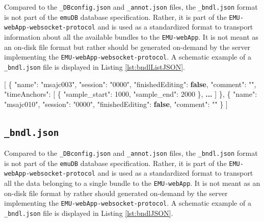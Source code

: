 \documentclass[]{book}
\newenvironment{Shaded}{\begin{snugshade}}{\end{snugshade}}
\newcommand{\DataTypeTok}[1]{\textcolor[rgb]{0.13,0.29,0.53}{#1}}
\newcommand{\DecValTok}[1]{\textcolor[rgb]{0.00,0.00,0.81}{#1}}
\newcommand{\ErrorTok}[1]{\textcolor[rgb]{0.64,0.00,0.00}{\textbf{#1}}}
\newcommand{\FunctionTok}[1]{\textcolor[rgb]{0.00,0.00,0.00}{#1}}
\newcommand{\KeywordTok}[1]{\textcolor[rgb]{0.13,0.29,0.53}{\textbf{#1}}}
\newcommand{\OtherTok}[1]{\textcolor[rgb]{0.56,0.35,0.01}{#1}}
\newcommand{\StringTok}[1]{\textcolor[rgb]{0.31,0.60,0.02}{#1}}
\begin{document}
Compared to the \texttt{\_DBconfig.json} and \texttt{\_annot.json} files, the \texttt{\_bndl.json} format is not part of the \texttt{emuDB} database specification. Rather, it is part of the \texttt{EMU-webApp-websocket-protocol} and is used as a standardized format to transport information about all the available bundles to the \texttt{EMU-webApp}. It is not meant as an on-disk file format but rather should be generated on-demand by the server implementing the \texttt{EMU-webApp-websocket-protocol}. A schematic example of a \texttt{\_bndl.json} file is displayed in Listing \ref{lst:bndlListJSON}.

\begin{Shaded}
\begin{Highlighting}[]
\OtherTok{[}
  \FunctionTok{\{}
  \DataTypeTok{"name"}\FunctionTok{:} \StringTok{"msajc003"}\FunctionTok{,}
  \DataTypeTok{"session"}\FunctionTok{:} \StringTok{"0000"}\FunctionTok{,}
  \DataTypeTok{"finishedEditing"}\FunctionTok{:} \KeywordTok{false}\FunctionTok{,}
  \DataTypeTok{"comment"}\FunctionTok{:} \StringTok{""}\FunctionTok{,}
  \DataTypeTok{"timeAnchors"}\FunctionTok{:} \OtherTok{[}
    \FunctionTok{\{}
      \DataTypeTok{"sample_start"}\FunctionTok{:} \DecValTok{1000}\FunctionTok{,}
      \DataTypeTok{"sample_end"}\FunctionTok{:} \DecValTok{2000}
    \FunctionTok{\}}\OtherTok{,} \ErrorTok{...}
  \OtherTok{]}
  \FunctionTok{\}}\OtherTok{,}
  \FunctionTok{\{}
  \DataTypeTok{"name"}\FunctionTok{:} \StringTok{"msajc010"}\FunctionTok{,}
  \DataTypeTok{"session"}\FunctionTok{:} \StringTok{"0000"}\FunctionTok{,}
  \DataTypeTok{"finishedEditing"}\FunctionTok{:} \KeywordTok{false}\FunctionTok{,}
  \DataTypeTok{"comment"}\FunctionTok{:} \StringTok{""}
  \FunctionTok{\}}
\OtherTok{]}
\end{Highlighting}
\end{Shaded}

\hypertarget{subsec:app-chapExampleFilesBndlJSON}{%
\subsection{\texorpdfstring{\texttt{\_bndl.json}}{\_bndl.json}}\label{subsec:app-chapExampleFilesBndlJSON}}

Compared to the \texttt{\_DBconfig.json} and \texttt{\_annot.json} files, the \texttt{\_bndl.json} format is not part of the \texttt{emuDB} database specification. Rather, it is part of the \texttt{EMU-webApp-websocket-protocol} and is used as a standardized format to transport all the data belonging to a single bundle to the \texttt{EMU-webApp}. It is not meant as an on-disk file format by rather should generated on-demand by the server implementing the \texttt{EMU-webApp-websocket-protocol}. A schematic example of a \texttt{\_bndl.json} file is displayed in Listing \ref{lst:bndlJSON}.
\end{document}
